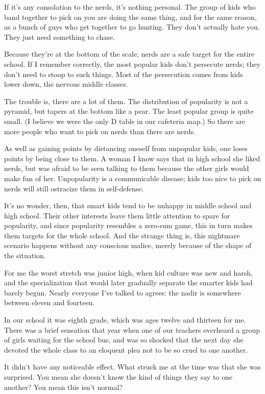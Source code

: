 \documentclass[12pt]{book}
\begin{document}
If it's any consolation to the nerds, it's nothing personal. The group
of kids who band together to pick on you are doing the same thing, and
for the same reason, as a bunch of guys who get together to go hunting.
They don't actually hate you. They just need something to chase.

Because they're at the bottom of the scale, nerds are a safe target for
the entire school. If I remember correctly, the most popular kids don't
persecute nerds; they don't need to stoop to such things. Most of the
persecution comes from kids lower down, the nervous middle classes.

The trouble is, there are a lot of them. The distribution of popularity
is not a pyramid, but tapers at the bottom like a pear. The least
popular group is quite small. (I believe we were the only D table in our
cafeteria map.) So there are more people who want to pick on nerds than
there are nerds.

As well as gaining points by distancing oneself from unpopular kids, one
loses points by being close to them. A woman I know says that in high
school she liked nerds, but was afraid to be seen talking to them
because the other girls would make fun of her. Unpopularity is a
communicable disease; kids too nice to pick on nerds will still
ostracize them in self-defense.

It's no wonder, then, that smart kids tend to be unhappy in middle
school and high school. Their other interests leave them little
attention to spare for popularity, and since popularity resembles a
zero-sum game, this in turn makes them targets for the whole school. And
the strange thing is, this nightmare scenario happens without any
conscious malice, merely because of the shape of the situation.

For me the worst stretch was junior high, when kid culture was new and
harsh, and the specialization that would later gradually separate the
smarter kids had barely begun. Nearly everyone I've talked to agrees:
the nadir is somewhere between eleven and fourteen.

In our school it was eighth grade, which was ages twelve and thirteen
for me. There was a brief sensation that year when one of our teachers
overheard a group of girls waiting for the school bus, and was so
shocked that the next day she devoted the whole class to an eloquent
plea not to be so cruel to one another.

It didn't have any noticeable effect. What struck me at the time was
that she was surprised. You mean she doesn't know the kind of things
they say to one another? You mean this isn't normal?
\end{document}
